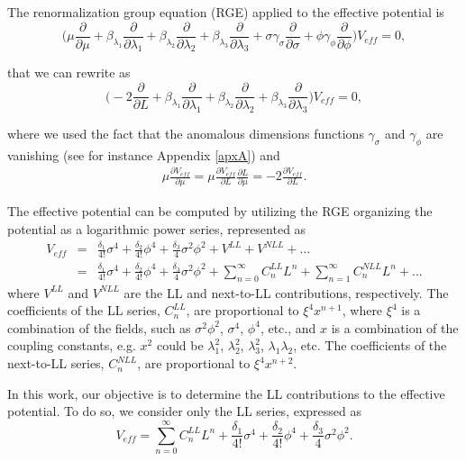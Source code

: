 \documentclass[11pt,a4paper,english,superscriptaddress,preprint,aps,prd]{revtex4}
\begin{document}
The renormalization group equation (RGE) applied to the effective potential is
\begin{equation}
 \Bigr(\mu\frac{\partial}{\partial\mu}+\beta_{\lambda_1}\frac{\partial}{\partial \lambda_1}+\beta_{\lambda_2}\frac{\partial}{\partial\lambda_2}+\beta_{\lambda_3}\frac{\partial}{\partial\lambda_3}+\sigma\gamma_\sigma\frac{\partial}{\partial\sigma}+\phi\gamma_\phi\frac{\partial}{\partial\phi}\Bigr)V_{eff}=0,
\end{equation}

\noindent that we can rewrite as
\begin{equation}\label{RGE}
 \Bigr(-2\frac{\partial}{\partial L}+\beta_{\lambda_1}\frac{\partial}{\partial \lambda_1}+\beta_{\lambda_2}\frac{\partial}{\partial\lambda_2}+\beta_{\lambda_3}\frac{\partial}{\partial\lambda_3}\Bigr)V_{eff}=0,
\end{equation}

\noindent where we used the fact that the anomalous dimensions functions $\gamma_\sigma$ and $\gamma_\phi$ are vanishing (see for instance Appendix \ref{apxA}) and
\begin{eqnarray}\label{RGE1}
 \mu\frac{\partial V_{eff}}{\partial\mu}=\mu\frac{\partial V_{eff}}{\partial L}\frac{\partial L}{\partial \mu}=-2\frac{\partial V_{eff}}{\partial L}.
\end{eqnarray}

The effective potential can be computed by utilizing the RGE organizing the potential as a logarithmic power series, represented as
\begin{eqnarray}
 V_{eff}&=&\frac{\delta_1}{4!}\sigma^4+\frac{\delta_2}{4!}\phi^4+\frac{\delta_3}{4}\sigma^2\phi^2+V^{LL}+V^{NLL}+...\nonumber\\
 &=&\frac{\delta_1}{4!}\sigma^4+\frac{\delta_2}{4!}\phi^4+\frac{\delta_3}{4}\sigma^2\phi^2+\sum_{n=0}^\infty C^{LL}_nL^n+\sum_{n=1}^\infty C^{NLL}_nL^n+...
\end{eqnarray}
where $V^{LL}$ and $V^{NLL}$ are the LL and next-to-LL contributions, respectively. The coefficients of the LL series, $C^{LL}_n$, are proportional to $\xi^4 x^{n+1}$, where $\xi^4$ is a combination of the fields, such as $\sigma^2\phi^2$, $\sigma^4$, $\phi^4$, etc., and $x$ is a combination of the coupling constants, e.g. $x^2$ could be $\lambda_1^2$, $\lambda_2^2$, $\lambda_3^2$, $\lambda_1\lambda_2$, etc. The coefficients of the next-to-LL series, $C^{NLL}_n$, are proportional to $\xi^4 x^{n+2}$.

In this work, our objective is to determine the LL contributions to the effective potential. To do so, we consider only the LL series, expressed as
\begin{equation}\label{LL}
 V_{eff}=\sum_{n=0}^\infty C_n^{LL}L^n+\frac{\delta_1}{4!}\sigma^4+\frac{\delta_2}{4!}\phi^4+\frac{\delta_3}{4}\sigma^2\phi^2.
\end{equation}
\end{document}
